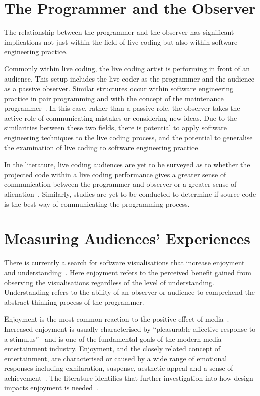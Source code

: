 \section{The Programmer and the Observer}

The relationship between the programmer and the observer has significant implications not just within the field of live coding but also within software engineering practice.

Commonly within live coding, the live coding artist is performing in front of an audience. This setup includes the live coder as the programmer and the audience as a passive observer. Similar structures occur within software engineering practice in pair programming and with the concept of the maintenance programmer~\cite{Robson1991}. In this case, rather than a passive role, the observer takes the active role of communicating mistakes or considering new ideas. Due to the similarities between these two fields, there is potential to apply software engineering techniques to the live coding process, and the potential to generalise the examination of live coding to software engineering practice.

In the literature, live coding audiences are yet to be surveyed as to whether the projected code within a live coding performance gives a greater sense of communication between the programmer and observer or a greater sense of alienation~\cite{Mclean2011}. Similarly, studies are yet to be conducted to determine if source code is the best way of communicating the programming process.

\section{Measuring Audiences' Experiences}

There is currently a search for software visualisations that increase enjoyment and understanding~\cite{McLean2010a}. Here enjoyment refers to the perceived benefit gained from observing the visualisations regardless of the level of understanding. Understanding refers to the ability of an observer or audience to comprehend the abstract thinking process of the programmer.

Enjoyment is the most common reaction to the positive effect of media~\cite{Vorderer2004}. Increased enjoyment is usually characterised by ``pleasurable affective response to a stimulus''~\cite{Brock2004} and is one of the fundamental goals of the modern media entertainment industry. Enjoyment, and the closely related concept of entertainment, are characterised or caused by a wide range of emotional responses including exhilaration, suspense, aesthetic appeal and a sense of achievement~\cite{Vorderer2004}. The literature identifies that further investigation into how design impacts enjoyment is needed~\cite{Reed1999}.

